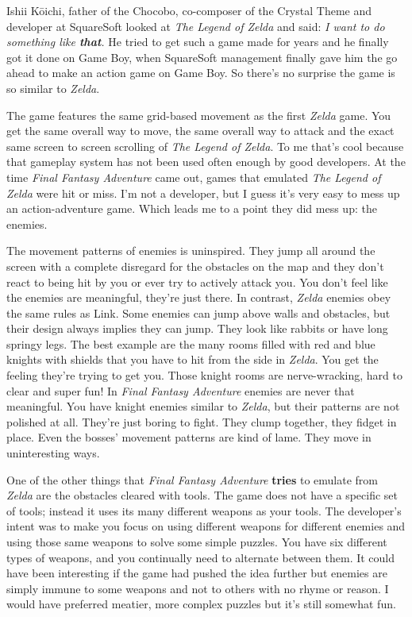 \documentclass{book}
\begin{document}
Ishii Kōichi, father of the Chocobo, co-composer of the Crystal Theme and developer at SquareSoft looked at \emph{The Legend of Zelda} and said: \emph{I want to do something like \textbf{that}.} He tried to get such a game made for years and he finally got it done on Game Boy, when SquareSoft management finally gave him the go ahead to make an action game on Game Boy. So there’s no surprise the game is so similar to \emph{Zelda}.

The game features the same grid-based movement as the first \emph{Zelda} game. You get the same overall way to move, the same overall way to attack and the exact same screen to screen scrolling of \emph{The Legend of Zelda}. To me that’s cool because that gameplay system has not been used often enough by good developers. At the time \emph{Final Fantasy Adventure} came out, games that emulated \emph{The Legend of Zelda} were hit or miss. I’m not a developer, but I guess it’s very easy to mess up an action-adventure game. Which leads me to a point they did mess up: the enemies.

The movement patterns of enemies is uninspired. They jump all around the screen with a complete disregard for the obstacles on the map and they don’t react to being hit by you or ever try to actively attack you. You don’t feel like the enemies are meaningful, they’re just there. In contrast, \emph{Zelda} enemies obey the same rules as Link. Some enemies can jump above walls and obstacles, but their design always implies they can jump. They look like rabbits or have long springy legs. The best example are the many rooms filled with red and blue knights with shields that you have to hit from the side in \emph{Zelda}. You get the feeling they’re trying to get you. Those knight rooms are nerve-wracking, hard to clear and super fun! In \emph{Final Fantasy Adventure} enemies are never that meaningful. You have knight enemies similar to \emph{Zelda}, but their patterns are not polished at all. They’re just boring to fight. They clump together, they fidget in place. Even the bosses’ movement patterns are kind of lame. They move in uninteresting ways.

One of the other things that \emph{Final Fantasy Adventure} \textbf{tries} to emulate from \emph{Zelda} are the obstacles cleared with tools. The game does not have a specific set of tools; instead it uses its many different weapons as your tools. The developer’s intent was to make you focus on using different weapons for different enemies and using those same weapons to solve some simple puzzles. You have six different types of weapons, and you continually need to alternate between them. It could have been interesting if the game had pushed the idea further but enemies are simply immune to some weapons and not to others with no rhyme or reason. I would have preferred meatier, more complex puzzles but it’s still somewhat fun.
\end{document}
